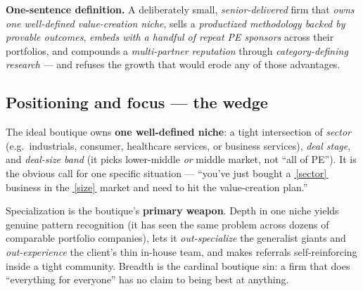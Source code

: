 \documentclass[11pt]{article}
\begin{document}
\begin{takeaway}
\textbf{One-sentence definition.} A deliberately small, \emph{senior-delivered} firm that
\emph{owns one well-defined value-creation niche}, sells a \emph{productized methodology
backed by provable outcomes}, \emph{embeds with a handful of repeat PE sponsors} across
their portfolios, and compounds a \emph{multi-partner reputation} through
\emph{category-defining research} --- and refuses the growth that would erode any of those
advantages.
\end{takeaway}

\subsection{Positioning and focus --- the wedge}
The ideal boutique owns \textbf{one well-defined niche}: a tight intersection of
\emph{sector} (e.g.\ industrials, consumer, healthcare services, or business services),
\emph{deal stage}, and \emph{deal-size band} (it picks lower-middle \emph{or} middle
market, not ``all of PE''). It is the obvious call for one specific situation --- ``you've
just bought a \underline{\,[sector]\,} business in the \underline{\,[size]\,} market and
need to hit the value-creation plan.''

Specialization is the boutique's \textbf{primary weapon}. Depth in one niche yields genuine
pattern recognition (it has seen the same problem across dozens of comparable portfolio
companies), lets it \emph{out-specialize} the generalist giants and \emph{out-experience}
the client's thin in-house team, and makes referrals self-reinforcing inside a tight
community. Breadth is the cardinal boutique sin: a firm that does ``everything for
everyone'' has no claim to being best at anything.
\end{document}
